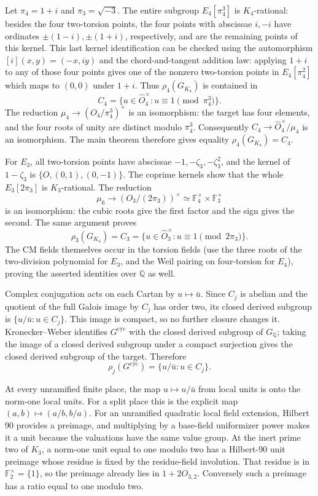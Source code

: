Let $\pi_4=1+i$ and $\pi_3=\sqrt{-3}$.  The entire subgroup
$E_4[\pi_4^3]$ is $K_4$-rational: besides the four two-torsion
points, the four points with abscissae $i,-i$ have ordinates
$\pm(1-i),\pm(1+i)$, respectively, and are the remaining points
of this kernel.  This last kernel identification can be checked
using the automorphism $[i](x,y)=(-x,iy)$ and the chord-and-tangent
addition law: applying $1+i$ to any of those four points gives
one of the nonzero two-torsion points in $E_4[\pi_4^2]$ which
maps to $(0,0)$ under $1+i$.
Thus $\rho_4(G_{K_4})$ is contained in
\[
 C_4=\{u\in\widehat O_4^\times:u\equiv1\pmod{\pi_4^3}\}.
\]
The reduction $\mu_4\to(O_4/\pi_4^3)^\times$ is an isomorphism:
the target has four elements, and the four roots of unity are distinct
modulo $\pi_4^3$.  Consequently $C_4\to\widehat O_4^\times/\mu_4$
is an isomorphism.  The main theorem therefore gives equality
$\rho_4(G_{K_4})=C_4$.

For $E_3$, all two-torsion points have abscissae
$-1,-\zeta_3,-\zeta_3^2$, and the kernel of $1-\zeta_3$ is
$\{O,(0,1),(0,-1)\}$.  The coprime kernels show that the whole
$E_3[2\pi_3]$ is $K_3$-rational.  The reduction
\[
 \mu_6\longrightarrow (O_3/(2\pi_3))^\times
       \simeq\mathbb F_4^\times\times\mathbb F_3^\times
\]
is an isomorphism: the cubic roots give the first factor and the
sign gives the second.  The same argument proves
\[
 \rho_3(G_{K_3})=C_3
   =\{u\in\widehat O_3^\times:u\equiv1\pmod{2\pi_3}\}.
\]
The CM fields themselves occur in the torsion fields (use the
three roots of the two-division polynomial for $E_3$, and the
Weil pairing on four-torsion for $E_4$), proving the asserted
identities over $\mathbb Q$ as well.

Complex conjugation acts on each Cartan by $u\mapsto\bar u$.
Since $C_j$ is abelian and the quotient of the full Galois image
by $C_j$ has order two, its closed derived subgroup is
$\{u/\bar u:u\in C_j\}$.  This image is compact, so no further
closure changes it.  Kronecker--Weber identifies
$G^{\mathrm{cyc}}$ with the closed derived subgroup of
$G_{\mathbb Q}$; taking the image of a closed derived subgroup
under a compact surjection gives the closed derived subgroup of
the target.  Therefore
\[
 \rho_j(G^{\mathrm{cyc}})=\{u/\bar u:u\in C_j\}.
\]

At every unramified finite place, the map $u\mapsto u/\bar u$
from local units is onto the norm-one local units.  For a split
place this is the explicit map $(a,b)\mapsto(a/b,b/a)$.
For an unramified quadratic local field extension, Hilbert 90
provides a preimage, and multiplying by a base-field uniformizer
power makes it a unit because the valuations have the same value
group.  At the inert prime two of $K_3$, a norm-one unit equal to
one modulo two has a Hilbert-90 unit preimage whose residue is
fixed by the residue-field involution.  That residue is in
$\mathbb F_2^\times=\{1\}$, so the preimage already lies in
$1+2O_{3,2}$.  Conversely such a preimage has a ratio equal to
one modulo two.

